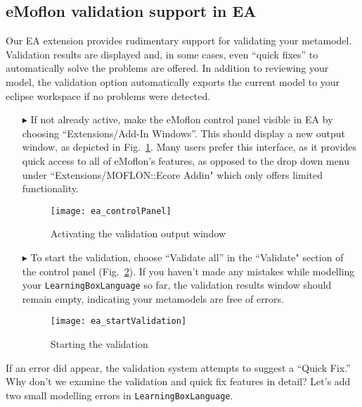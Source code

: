 \newpage
\visHeader
\hypertarget{validation vis}{} 
\subsection{eMoflon validation support in EA}

Our EA extension provides rudimentary support for validating your metamodel. Validation results are displayed and, in some cases, even ``quick fixes'' to
automatically solve the problems are offered. In addition to reviewing your model, the validation option automatically exports the current model to your eclipse
workspace if no problems were detected.

\begin{enumerate}
\item[$\blacktriangleright$] If not already active, make the eMoflon control panel visible in EA by choosing ``Extensions/\-Add-In Windows''. This should
display a new output window, as depicted in Fig.~\ref{fig:validation_output}. Many users prefer this interface, as it provides quick access to all of eMoflon's
features, as opposed to the drop down menu under ``Extensions/MOFLON::Ecore Addin" which only offers limited functionality.

\begin{figure}[htbp]
	\centering
  \texttt{[image: ea\_controlPanel]}
	\caption{Activating the validation output window}
	\label{fig:validation_output}
\end{figure}
\FloatBarrier

\clearpage
\item[$\blacktriangleright$] To start the validation, choose ``Validate all'' in the ``Validate" section of the control panel
(Fig.~\ref{fig:validation_menu}). If you haven't made any mistakes while modelling your \texttt{LearningBoxLanguage} so far, the validation results window
should remain empty, indicating your metamodels are free of errors.

\begin{figure}[htbp]
	\centering
  \texttt{[image: ea\_startValidation]}
	\caption{Starting the validation}
	\label{fig:validation_menu}
\end{figure}
\FloatBarrier
\end{enumerate}

If an error did appear, the validation system attempts to suggest a ``Quick Fix.'' Why don't we examine the validation and quick fix features in detail? Let's
add two small modelling errors in \texttt{LearningBoxLanguage}.

